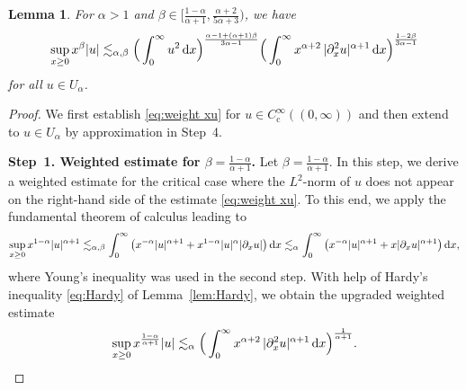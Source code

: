 \documentclass[reqno,12pt]{amsart}
\renewcommand{\d}{\ensuremath{\mathrm{d}}}
\renewcommand{\d}{\ensuremath{{\rm d}}}
\newtheorem{lemma}[theorem]{Lemma}
\numberwithin{equation}{section}
\begin{document}
%
\begin{lemma}\label{lem:weight xu}
For \(\alpha >1\) and \(\beta \in \big[\frac{1-\alpha}{\alpha +1}, \frac{\alpha+2}{5\alpha +3}\big)\),
%
we have
%
\begin{equation}\label{eq:weight xu}
\sup_{x \ge 0} x^\beta |u| \lesssim_{\alpha,\beta} \Big(\int_0^\infty u^2 \, \d x\Big)^{\frac{\alpha -1 + (\alpha +1)\beta}{3\alpha -1}} \Big(\int_0^\infty x^{\alpha+2} \, |\partial_x^2 u|^{\alpha+1} \, \d x\Big)^{\frac{1-2\beta}{3\alpha -1}}
\end{equation}
%
for all $u \in U_\alpha$.
\end{lemma}
%
\begin{proof}
%
We first establish \eqref{eq:weight xu} for $u \in C^\infty_\mathrm{c}((0,\infty))$
and then extend to $u \in U_\alpha$ by approximation in Step~4.

%
\bigskip
%

\noindent\textbf{Step~1. Weighted estimate for \(\beta= \frac{1-\alpha}{\alpha +1}\).}
%
Let $\beta = \frac{1-\alpha}{\alpha+1}$. In this step, we derive a weighted estimate for the critical case where the $L^2$-norm of $u$ does not appear on the right-hand side of the estimate \eqref{eq:weight xu}. To this end, we apply the fundamental theorem of calculus leading to
%
\begin{equation*}%
\sup_{x \ge 0} x^{1-\alpha} |u|^{\alpha +1} \lesssim_{\alpha,\beta} \int_0^\infty \left( x^{-\alpha} |u|^{\alpha +1}  +  x^{1-\alpha} |u|^{\alpha}|\partial_x u| \right) \d x \lesssim_{\alpha} \int_0^\infty \left( x^{-\alpha} |u|^{\alpha +1}  +  x |\partial_x u|^{\alpha+1} \right) \d x,
\end{equation*}
%
where Young's inequality was used in the second step. With help of Hardy’s inequality \eqref{eq:Hardy} of Lemma~\ref{lem:Hardy}, we obtain the upgraded weighted estimate
%
\begin{equation}\label{eq:weight xu7}
\sup_{x \ge 0} x^{\frac{1-\alpha}{\alpha + 1}} |u| \lesssim_{\alpha} \Big(\int_0^\infty  x^{\alpha+2} \, |\partial_x^2 u|^{\alpha+1} \, \d x\Big)^{\frac{1}{\alpha +1}}.
\end{equation}
%

%
\bigskip
%


\end{proof}
\end{document}

